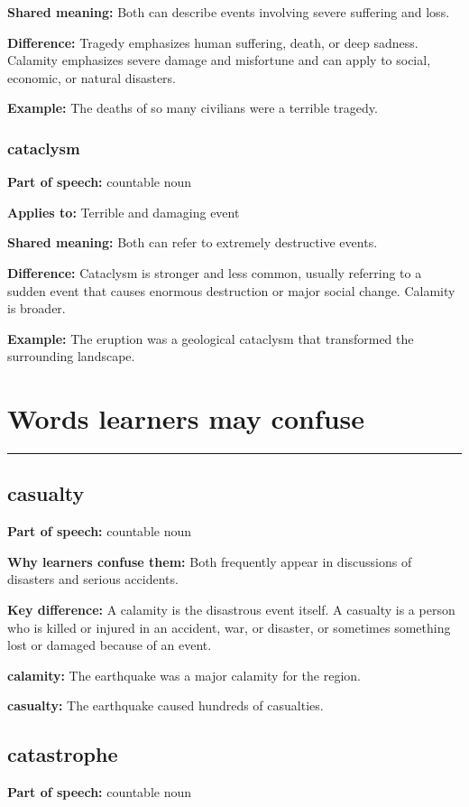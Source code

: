 \documentclass[11pt]{article}
\newcommand{\sectionrule}{\par\vspace{-0.5em}\noindent\textcolor{Accent}{\rule{\linewidth}{0.6pt}}\par}
\begin{document}
\textbf{Shared meaning:} Both can describe events involving severe suffering and loss.

\textbf{Difference:} Tragedy emphasizes human suffering, death, or deep sadness. Calamity emphasizes severe damage and misfortune and can apply to social, economic, or natural disasters.

\textbf{Example:} The deaths of so many civilians were a terrible tragedy.

\subsubsection{cataclysm}
\textbf{Part of speech:} countable noun

\textbf{Applies to:} Terrible and damaging event

\textbf{Shared meaning:} Both can refer to extremely destructive events.

\textbf{Difference:} Cataclysm is stronger and less common, usually referring to a sudden event that causes enormous destruction or major social change. Calamity is broader.

\textbf{Example:} The eruption was a geological cataclysm that transformed the surrounding landscape.

\section{Words learners may confuse}
\sectionrule
\subsection{casualty}
\textbf{Part of speech:} countable noun

\textbf{Why learners confuse them:} Both frequently appear in discussions of disasters and serious accidents.

\textbf{Key difference:} A calamity is the disastrous event itself. A casualty is a person who is killed or injured in an accident, war, or disaster, or sometimes something lost or damaged because of an event.

\textbf{calamity:} The earthquake was a major calamity for the region.

\textbf{casualty:} The earthquake caused hundreds of casualties.

\subsection{catastrophe}
\textbf{Part of speech:} countable noun
\end{document}
